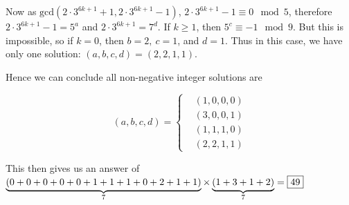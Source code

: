 \documentclass[titlepage=true]{scrartcl}
\begin{document}
\begin{solution}
         Now as \(\mathrm{gcd}(2\cdot3^{6k+1}+1,2\cdot3^{6k+1}-1)\), \(2\cdot3^{6k+1}-1\equiv0\mod{5}\), therefore \(2\cdot3^{6k+1}-1=5^a\) and \(2\cdot3^{6k+1}=7^d\). 
         If \(k\geq1\), then \(5^c\equiv-1\mod{9}\). 
         But this is impossible, so if \(k=0\), then \(b=2,\ c=1\), and \(d=1\).  
         Thus in this case, we have only one solution: \((a,b,c,d)=(2,2,1,1)\).

         Hence we can conclude all non-negative integer solutions are

         \begin{equation*}
            (a,b,c,d)=\begin{cases}
                 &(1,0,0,0)\\
                 &(3,0,0,1)\\
                 &(1,1,1,0)\\
                 &(2,2,1,1)
             \end{cases}
         \end{equation*}
        
        This then gives us an answer of \(\underbrace{(0+0+0+0+0+1+1+1+0+2+1+1)}_{7}\times\underbrace{(1+3+1+2)}_{7}=\fbox{49}\) 
     \end{solution}
\end{document}
